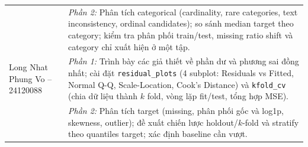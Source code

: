 \begin{longtable}{>{\raggedright\arraybackslash}p{}%
                  >{\raggedright\arraybackslash}p{}}
    & \textit{Phần 2:} Phân tích categorical (cardinality, rare categories,
      text inconsistency, ordinal candidates); so sánh median target theo
      category; kiểm tra phân phối train/test, missing ratio shift và
      category chỉ xuất hiện ở một tập. \\[4pt]
Long Nhat Phung Vo -- 24120088
    & \textit{Phần 1:} Trình bày các giả thiết về phần dư và phương sai đồng
      nhất; cài đặt \texttt{residual\_plots} (4 subplot: Residuals vs
      Fitted, Normal Q-Q, Scale-Location, Cook's Distance) và
      \texttt{kfold\_cv} (chia dữ liệu thành $k$ fold, vòng lặp fit/test,
      tổng hợp MSE). \\
    & \textit{Phần 2:} Phân tích target (missing, phân phối gốc và log1p,
      skewness, outlier); đề xuất chiến lược holdout/$k$-fold và
      stratify theo quantiles target; xác định baseline cần vượt. \\
\end{longtable}